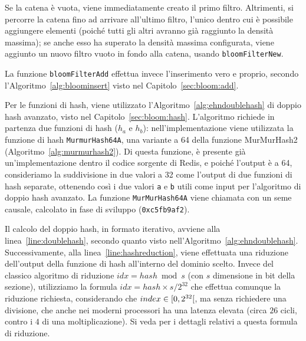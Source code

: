 

Se la catena è vuota, viene immediatamente creato il primo filtro. Altrimenti, si percorre la catena
fino ad arrivare all'ultimo filtro, l'unico dentro cui è possibile aggiungere elementi (poiché tutti
gli altri avranno già raggiunto la densità massima); se anche esso ha superato la densità massima 
configurata, viene aggiunto un nuovo filtro vuoto in fondo alla catena, usando \verb|bloomFilterNew|.



La funzione \verb|bloomFilterAdd| effettua invece l'inserimento vero e proprio, secondo
l'Algoritmo~\ref{alg:bloominsert} visto nel Capitolo~\ref{sec:bloom:add}.

Per le funzioni di hash, viene utilizzato l'Algoritmo~\ref{alg:ehndoublehash} di doppio hash
avanzato, visto nel Capitolo~\ref{sec:bloom:hash}. L'algoritmo richiede in partenza due funzioni di
hash ($h_a$ e $h_b$): nell'implementazione viene utilizzata la funzione di hash
\verb|MurmurHash64A|, una variante a \SI{64}{\bit} della funzione MurMurHash2
(Algoritmo~\ref{alg:murmurhash2}). Di questa funzione, è presente già un'implementazione dentro il
codice sorgente di Redis, e poiché l'output è a \SI{64}{\bit}, consideriamo la suddivisione in due
valori a \SI{32}{\bit} come l'output di due funzioni di hash separate, ottenendo così i due valori
\verb|a| e \verb|b| utili come input per l'algoritmo di doppio hash avanzato. La funzione
\verb|MurMurHash64A| viene chiamata con un seme causale, calcolato in fase di sviluppo
(\verb|0xc5fb9af2|).

Il calcolo del doppio hash, in formato iterativo, avviene alla linea~\ref{line:doublehash}, secondo
quanto visto nell'Algoritmo~\ref{alg:ehndoublehash}. Successivamente, alla
linea~\ref{line:hashreduction}, viene effettuata una riduzione dell'output della funzione di hash
all'interno del dominio scelto. Invece del classico algoritmo di riduzione $idx = hash \bmod s$ (con
$s$ dimensione in bit della sezione), utilizziamo la formula $idx = hash \times s / 2^{32}$ che
effettua comunque la riduzione richiesta, considerando che $index \in \interval[open
right]{0}{2^{32}}$, ma senza richiedere una divisione, che anche nei moderni processori ha una latenza
elevata (circa $26$ cicli, contro i $4$ di una moltiplicazione). Si veda \cite{lemirereduction} per
i dettagli relativi a questa formula di riduzione.

